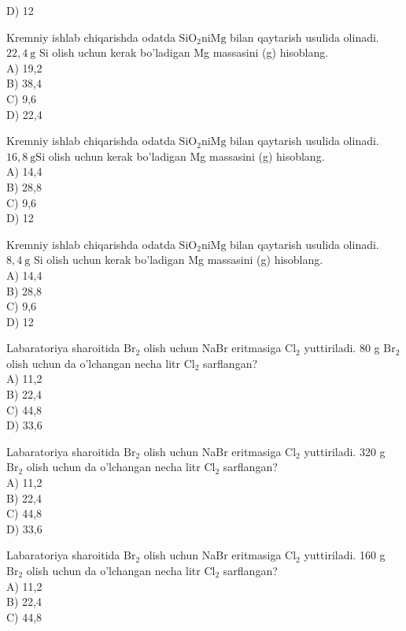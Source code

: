 D) 12
  \item Kremniy ishlab chiqarishda odatda $\mathrm{SiO}_{2} \mathrm{ni} \mathrm{Mg}$ bilan qaytarish usulida olinadi. $22,4 \mathrm{~g}$ Si olish uchun kerak bo'ladigan Mg massasini (g) hisoblang.\\
A) 19,2\\
B) 38,4\\
C) 9,6\\
D) 22,4
  \item Kremniy ishlab chiqarishda odatda $\mathrm{SiO}_{2} \mathrm{ni} \mathrm{Mg}$ bilan qaytarish usulida olinadi. $16,8 \mathrm{~g} \mathrm{Si}$ olish uchun kerak bo'ladigan Mg massasini (g) hisoblang.\\
A) 14,4\\
B) 28,8\\
C) 9,6\\
D) 12
  \item Kremniy ishlab chiqarishda odatda $\mathrm{SiO}_{2} \mathrm{ni} \mathrm{Mg}$ bilan qaytarish usulida olinadi. $8,4 \mathrm{~g}$ Si olish uchun kerak bo'ladigan Mg massasini (g) hisoblang.\\
A) 14,4\\
B) 28,8\\
C) 9,6\\
D) 12
  \item Labaratoriya sharoitida $\mathrm{Br}_{2}$ olish uchun NaBr eritmasiga $\mathrm{Cl}_{2}$ yuttiriladi. 80 g $\mathrm{Br}_{2}$ olish uchun da o'lchangan necha litr $\mathrm{Cl}_{2}$ sarflangan?\\
A) 11,2\\
B) 22,4\\
C) 44,8\\
D) 33,6
  \item Labaratoriya sharoitida $\mathrm{Br}_{2}$ olish uchun NaBr eritmasiga $\mathrm{Cl}_{2}$ yuttiriladi. 320 g $\mathrm{Br}_{2}$ olish uchun da o'lchangan necha litr $\mathrm{Cl}_{2}$ sarflangan?\\
A) 11,2\\
B) 22,4\\
C) 44,8\\
D) 33,6
  \item Labaratoriya sharoitida $\mathrm{Br}_{2}$ olish uchun NaBr eritmasiga $\mathrm{Cl}_{2}$ yuttiriladi. 160 g $\mathrm{Br}_{2}$ olish uchun da o'lchangan necha litr $\mathrm{Cl}_{2}$ sarflangan?\\
A) 11,2\\
B) 22,4\\
C) 44,8\\
